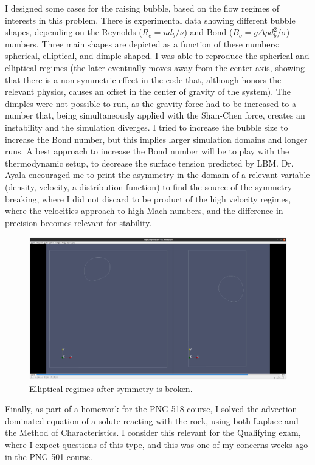 \documentclass[12pt]{article}
\begin{document}
	I designed some cases for the raising bubble, based on the flow regimes of interests in this problem. There is experimental data showing different bubble shapes, depending on the Reynolds ($R_e = u d_b/\nu$) and Bond ($B_o = g \Delta \rho d^2_b / \sigma$) numbers. Three main shapes are depicted as a function of these numbers: spherical, elliptical, and dimple-shaped. I was able to reproduce the spherical and elliptical regimes (the later eventually moves away from the center axis, showing that there is a non symmetric effect in the code that, although honors the relevant physics, causes an offset in the center of gravity of the system). The dimples were not possible to run, as the gravity force had to be increased to a number that, being simultaneously applied with the Shan-Chen force, creates an instability and the simulation diverges. I tried to increase the bubble size to increase the Bond number, but this implies larger simulation domains and longer runs. A best approach to increase the Bond number will be to play with the thermodynamic setup, to decrease the surface tension predicted by LBM. Dr. Ayala encouraged me to print the asymmetry in the domain of a relevant variable (density, velocity, a distribution function) to find the source of the symmetry breaking, where I did not discard to be product of the high velocity regimes, where the velocities approach to high Mach numbers, and the difference in precision becomes relevant for stability.
	
	\begin{figure}[h]
		\centering
		\includegraphics[scale=0.1]{pics/ellipseCompMove.png}
		\caption{Elliptical regimes after symmetry is broken.}
		\label{fig:ellipseCompMove}
	\end{figure}
	
	Finally, as part of a homework for the PNG 518 course, I solved the advection-dominated equation of a solute reacting with the rock, using both Laplace and the Method of Characteristics. I consider this relevant for the Qualifying exam, where I expect questions of this type, and this was one of my concerns weeks ago in the PNG 501 course. 
	 
\end{document}
